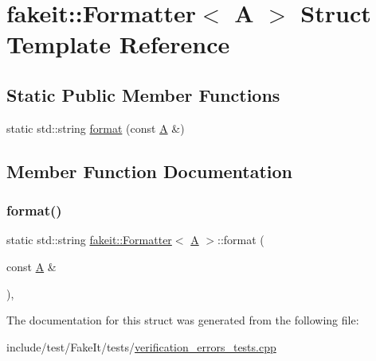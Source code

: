 \hypertarget{structfakeit_1_1Formatter_3_01A_01_4}{}\section{fakeit\+::Formatter$<$ A $>$ Struct Template Reference}
\label{structfakeit_1_1Formatter_3_01A_01_4}
\subsection*{Static Public Member Functions}
\begin{DoxyCompactItemize}
\item 
static std\+::string \mbox{\hyperlink{structfakeit_1_1Formatter_3_01A_01_4_ae75a3e6a049d9d873aee22879cade37c}{format}} (const \mbox{\hyperlink{structA}{A}} \&)
\end{DoxyCompactItemize}


\subsection{Member Function Documentation}
\mbox{\label{structfakeit_1_1Formatter_3_01A_01_4_ae75a3e6a049d9d873aee22879cade37c}} 
\subsubsection{\texorpdfstring{format()}{format()}}
{\footnotesize\ttfamily static std\+::string \mbox{\hyperlink{structfakeit_1_1Formatter}{fakeit\+::\+Formatter}}$<$ \mbox{\hyperlink{structA}{A}} $>$\+::format (\begin{DoxyParamCaption}\item[{const \mbox{\hyperlink{structA}{A}} \&}]{ }\end{DoxyParamCaption})\hspace{0.3cm}{\ttfamily [inline]}, {\ttfamily [static]}}



The documentation for this struct was generated from the following file\+:\begin{DoxyCompactItemize}
\item 
include/test/\+Fake\+It/tests/\mbox{\hyperlink{verification__errors__tests_8cpp}{verification\+\_\+errors\+\_\+tests.\+cpp}}\end{DoxyCompactItemize}
